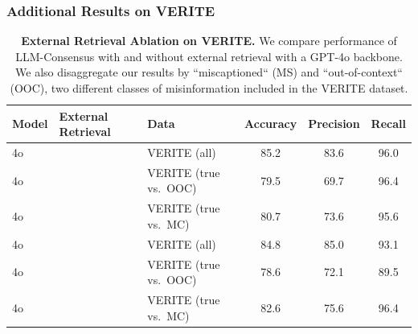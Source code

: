 \documentclass{article}
\newcommand{\cmark}{\textcolor{green}{\ding{51}}} %
\newcommand{\xmark}{\ding{55}} %
\theoremstyle{plain}
\theoremstyle{definition}
\theoremstyle{remark}
\begin{document}
\subsubsection{Additional Results on VERITE}
\begin{table}[ht]
  \centering
  \begin{tabular}{ll l c c c}
    \toprule
    \textbf{Model} & \textbf{External Retrieval} & \textbf{Data} & \textbf{Accuracy} & \textbf{Precision} & \textbf{Recall}  \\
    \midrule
    4o    & \cmark                & VERITE (all)            & 85.2   & 83.6    & 96.0  \\
    4o    & \cmark                & VERITE (true vs.\ OOC)  & 79.5   & 69.7    & 96.4  \\
    4o    & \cmark                & VERITE (true vs.\ MC)   & 80.7   & 73.6    & 95.6  \\
    4o    & \xmark                 & VERITE (all)            & 84.8   & 85.0    & 93.1  \\
    4o    & \xmark                 & VERITE (true vs.\ OOC)  & 78.6   & 72.1    & 89.5  \\
    4o    & \xmark                 & VERITE (true vs.\ MC)   & 82.6   & 75.6   & 96.4  \\
    \bottomrule
  \end{tabular}
  \vspace{0.1cm}
  \caption{\textbf{External Retrieval Ablation on VERITE.} We compare performance of LLM-Consensus with and without external retrieval with a GPT-4o backbone. We also disaggregate our results by ``miscaptioned`` (MS) and ``out-of-context`` (OOC), two different classes of misinformation included in the VERITE dataset.}
  \label{tab:veriteb-results}
\end{table}
\end{document}
